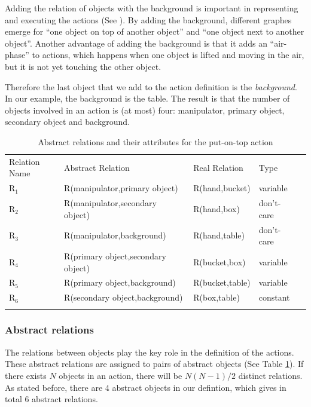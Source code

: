 Adding the relation of objects with the background is important in representing and executing the actions (See \cite{TAMD13}).
By adding the background, different graphes emerge for ``one object on top of another object'' and ``one object next to another object''.
Another advantage of adding the background is that it adds an ``air-phase'' to actions,
which happens when one object is lifted and moving in the air, but it is not yet touching the other object.

Therefore the last object that we add to the action definition is the \textit{background}.
In our example, the background is the table.
The result is that the number of objects involved in an action is (at most) four: manipulator, primary object, secondary object and background.

\begin{table}
\centering
\caption{Abstract relations and their attributes for the put-on-top action}
\begin{tabular}{ lllll }
\hline\noalign{\smallskip}
Relation Name & Abstract Relation & Real Relation & Type \\
\noalign{\smallskip}\hline\noalign{\smallskip}
$\text{R}_1$  & R(manipulator,primary object) & R(hand,bucket) & variable \\
$\text{R}_2$  & R(manipulator,secondary object)& R(hand,box) & don't-care \\
$\text{R}_3$  & R(manipulator,background) & R(hand,table) & don't-care \\
$\text{R}_4$  & R(primary object,secondary object) & R(bucket,box) & variable  \\
$\text{R}_5$  & R(primary object,background) & R(bucket,table) & variable \\
$\text{R}_6$  & R(secondary object,background)& R(box,table) & constant \\
\noalign{\smallskip}\hline
\end{tabular}
\label{tab:relations}
\end{table}

\subsubsection{Abstract relations}

The relations between objects play the key role in the definition of the actions.
These abstract relations are assigned to pairs of abstract objects (See Table \ref{tab:relations}).
If there exists $N$ objects in an action,
there will be $N(N-1)/2$ distinct relations.
As stated before, there are 4 abstract objects in our defintion, which gives in total 6 abstract relations.


